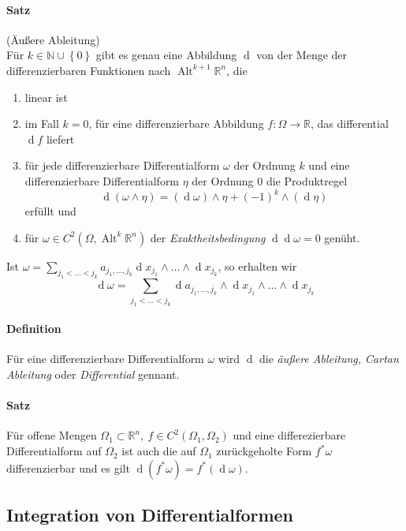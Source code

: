 \documentclass[12pt,a4paper,fleqn]{article}
\def\set#1{{\left\{ #1 \right\}}}
\def\R{{\mathbb{R}}}
\def\d{{\operatorname{d}}}
\begin{document}
\paragraph{Satz} (Äußere Ableitung)\\
Für $k\in \mathbb{N}\cup\set{0}$ gibt es genau eine Abbildung $\d$ von der Menge der differenzierbaren Funktionen nach $\operatorname{Alt}^{k+1} \R^n$, die
\begin{enumerate}
\item linear ist
\item im Fall $k=0$, für eine differenzierbare Abbildung $f\colon \Omega \rightarrow \R$, das differential $\d f$ liefert
\item für jede differenzierbare Differentialform $\omega$ der Ordnung $k$ und eine differenzierbare Differentialform $\eta$ der Ordnung $0$ die Produktregel
\begin{displaymath}
\d (\omega\wedge\eta) = (\d \omega) \wedge\eta + (-1)^k\wedge(\d \eta)
\end{displaymath}
erfüllt und
\item für $\omega \in C^2(\Omega, \operatorname{Alt}^k \R^n)$ der \textit{Exaktheitsbedingung} $\d\d \omega = 0$ genüht.
\end{enumerate}
Ist $\omega = \sum_{j_1 <\dots < j_k} a_{j_1, \dots, j_k}\d x_{j_1}\wedge\dots\wedge\d x_{j_k}$, so erhalten wir 
\begin{displaymath}
\d\omega = \sum_{j_1 < \dots < j_k}\d a_{j_1, \dots, j_k} \wedge\d x_{j_1}\wedge\dots\wedge\d x_{j_k}
\end{displaymath}

\paragraph{Definition} Für eine differenzierbare Differentialform $\omega$ wird $\d$ die \textit{äußere Ableitung, Cartan Ableitung} oder \textit{Differential} gennant.

\paragraph{Satz} Für offene Mengen $\Omega_1\subset \R^n,\ f\in C^2(\Omega_1, \Omega_2)$ und eine differezierbare Differentialform auf $\Omega_2$ ist auch die auf $\Omega_1$ zurückgeholte Form $f^\ast\omega$ differenzierbar und es gilt $\d (f^\ast\omega)=f^\ast(\d \omega)$.

\subsection{Integration von Differentialformen}
\end{document}
